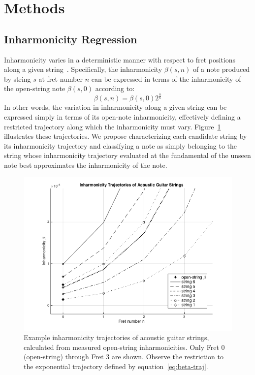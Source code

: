\documentclass[convention,peer-reviewed]{aesconf}
\begin{document}
\section{Methods}

\subsection{Inharmonicity Regression}
Inharmonicity varies in a deterministic manner with respect to fret positions along a given string~\cite{barbanchoi2012}. Specifically, the inharmonicity $\beta(s,n)$ of a note produced by string $s$ at fret number $n$ can be expressed in terms of the inharmonicity of the open-string note $\beta(s,0)$ according to:
\begin{equation} 
\label{eq:beta-traj}
\beta(s,n) = \beta(s,0)2^{\frac{n}{6}}
\end{equation}
In other words, the variation in inharmonicity along a given string can be expressed simply in terms of its open-note inharmonicity, effectively defining a restricted trajectory along which the inharmonicity must vary. Figure~\ref{fig:beta-trajectories-ag} illustrates these trajectories. We propose characterizing each candidate string by its inharmonicity trajectory and classifying a note as simply belonging to the string whose inharmonicity trajectory evaluated at the fundamental of the unseen note best approximates the inharmonicity of the note.

\begin{figure}[h] 
\centering
\includegraphics[scale=0.35]{figs/beta-trajectories-ag}
\caption{Example inharmonicity trajectories of acoustic guitar strings, calculated from measured open-string inharmonicities. Only Fret 0 (open-string) through Fret 3 are shown. Observe the restriction to the exponential trajectory defined by equation~\eqref{eq:beta-traj}.}
\label{fig:beta-trajectories-ag}
\end{figure}
\end{document}
